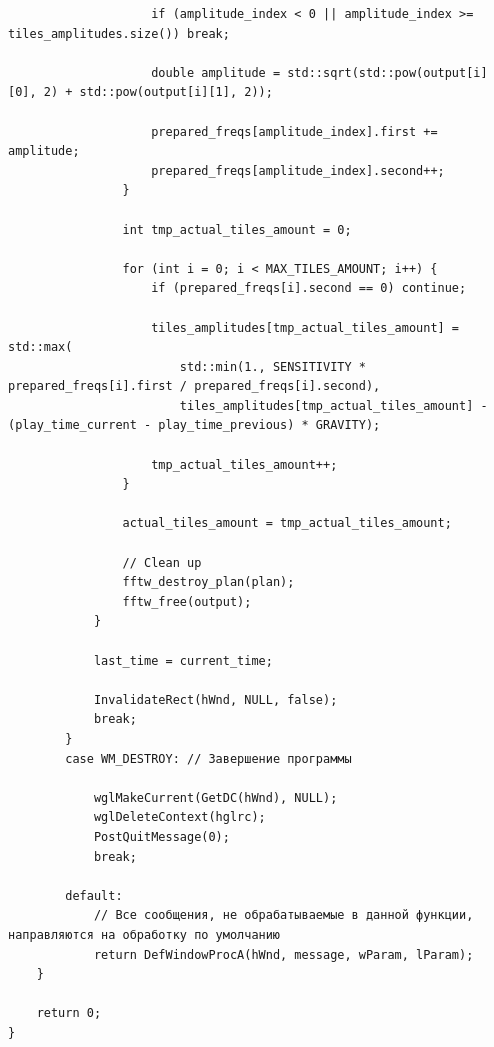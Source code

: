 \documentclass[a4paper,14pt]{extarticle}
\begin{document}
\begin{verbatim}
                    if (amplitude_index < 0 || amplitude_index >= tiles_amplitudes.size()) break;

                    double amplitude = std::sqrt(std::pow(output[i][0], 2) + std::pow(output[i][1], 2));

                    prepared_freqs[amplitude_index].first += amplitude;
                    prepared_freqs[amplitude_index].second++;
                }

                int tmp_actual_tiles_amount = 0;

                for (int i = 0; i < MAX_TILES_AMOUNT; i++) {
                    if (prepared_freqs[i].second == 0) continue;

                    tiles_amplitudes[tmp_actual_tiles_amount] = std::max(
                        std::min(1., SENSITIVITY * prepared_freqs[i].first / prepared_freqs[i].second),
                        tiles_amplitudes[tmp_actual_tiles_amount] - (play_time_current - play_time_previous) * GRAVITY);

                    tmp_actual_tiles_amount++;
                }

                actual_tiles_amount = tmp_actual_tiles_amount;

                // Clean up
                fftw_destroy_plan(plan);
                fftw_free(output);
            }

            last_time = current_time;

            InvalidateRect(hWnd, NULL, false);
            break;
        }
        case WM_DESTROY: // Завершение программы
            
            wglMakeCurrent(GetDC(hWnd), NULL);
            wglDeleteContext(hglrc);
            PostQuitMessage(0);
            break;

        default:
            // Все сообщения, не обрабатываемые в данной функции, направляются на обработку по умолчанию
            return DefWindowProcA(hWnd, message, wParam, lParam);
    }

    return 0;
}
\end{verbatim}
\end{document}
